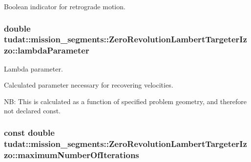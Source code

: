 Boolean indicator for retrograde motion. 
\subsubsection[{\texorpdfstring{lambda\+Parameter}{lambdaParameter}}]{\setlength{\rightskip}{0pt plus 5cm}double tudat\+::mission\+\_\+segments\+::\+Zero\+Revolution\+Lambert\+Targeter\+Izzo\+::lambda\+Parameter\hspace{0.3cm}{\ttfamily [protected]}}\hypertarget{classtudat_1_1mission__segments_1_1ZeroRevolutionLambertTargeterIzzo_ab173c76a2cc122df13c2a43201508211}{}\label{classtudat_1_1mission__segments_1_1ZeroRevolutionLambertTargeterIzzo_ab173c76a2cc122df13c2a43201508211}


Lambda parameter. 

Calculated parameter necessary for recovering velocities.

NB\+: This is calculated as a function of specified problem geometry, and therefore not declared const. 
\subsubsection[{\texorpdfstring{maximum\+Number\+Of\+Iterations}{maximumNumberOfIterations}}]{\setlength{\rightskip}{0pt plus 5cm}const double tudat\+::mission\+\_\+segments\+::\+Zero\+Revolution\+Lambert\+Targeter\+Izzo\+::maximum\+Number\+Of\+Iterations\hspace{0.3cm}{\ttfamily [protected]}}\hypertarget{classtudat_1_1mission__segments_1_1ZeroRevolutionLambertTargeterIzzo_afbdf81b1a06e92fe4fe0198dd3ca6877}{}\label{classtudat_1_1mission__segments_1_1ZeroRevolutionLambertTargeterIzzo_afbdf81b1a06e92fe4fe0198dd3ca6877}


